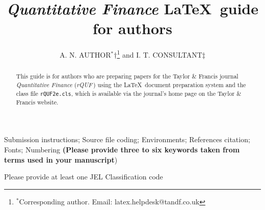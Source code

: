 \documentclass{rQUF2e}
\theoremstyle{plain}
\theoremstyle{definition}
\theoremstyle{remark}
\begin{document}

\title{{\textit{Quantitative Finance}} \LaTeX\ guide for authors}

\author{A. N. AUTHOR$^{\ast}$$\dag$\thanks{$^\ast$Corresponding author.
Email: latex.helpdesk@tandf.co.uk} and I. T. CONSULTANT${\ddag}$\\
  }

\maketitle

\begin{abstract}
This guide is for authors who are preparing papers for the Taylor \& Francis journal {\it Quantitative Finance} ({\it rQUF}\,) using the \LaTeX\ document preparation system and the class file {\tt rQUF2e.cls}, which is available via the journal's home page on the Taylor \& Francis website.
\end{abstract}

\begin{keywords}
Submission instructions; Source file coding; Environments; References citation; Fonts; Numbering {\bf{(Please provide three to six keywords taken from terms used in your manuscript}})
\end{keywords}

\begin{classcode}Please provide at least one JEL Classification code\end{classcode}
\end{document}
